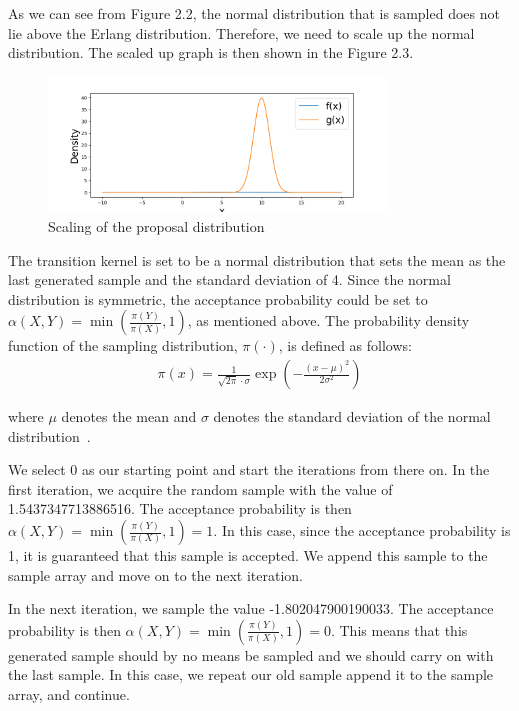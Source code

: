As we can see from Figure 2.2, the normal distribution that is sampled does not lie above the Erlang distribution. Therefore, we need to scale up the normal distribution. The scaled up graph is then shown in the Figure 2.3.

\begin{figure}[H]
    \centering
    \includegraphics[width=0.8\textwidth]{figures/mcmc_example/second_step.png}
    \captionsetup{width=.8\textwidth}
    \caption{Scaling of the proposal distribution}
    \label{fig:enter-label}
\end{figure}



The transition kernel is set to be a normal distribution that sets the mean as the last generated sample and the standard deviation of 4. Since the normal distribution is symmetric, the acceptance probability could be set to $\alpha(X, Y) = \min (\frac{\pi(Y)}{\pi(X)}, 1)$, as mentioned above. The probability density function of the sampling distribution, $\pi(\cdot)$, is defined as follows:
\begin{align}
\pi(x) = \frac{1}{\sqrt{2\pi} \cdot \sigma}\exp(-\frac{(x-\mu)^2}{2\sigma^2})
\end{align}

where $\mu$ denotes the mean and $\sigma$ denotes the standard deviation of the normal distribution~\cite{densityFunction}.

We select 0 as our starting point and start the iterations from there on. In the first iteration, we acquire the random sample with the value of 1.5437347713886516. The acceptance probability is then $\alpha(X, Y) = \min (\frac{\pi(Y)}{\pi(X)}, 1) = 1$. In this case, since the acceptance probability is 1, it is guaranteed that this sample is accepted. We append this sample to the sample array and move on to the next iteration.

In the next iteration, we sample the value -1.802047900190033. The acceptance probability is then $\alpha(X, Y) = \min (\frac{\pi(Y)}{\pi(X)}, 1) = 0$. This means that this generated sample should by no means be sampled and we should carry on with the last sample. In this case, we repeat our old sample append it to the sample array, and continue.

